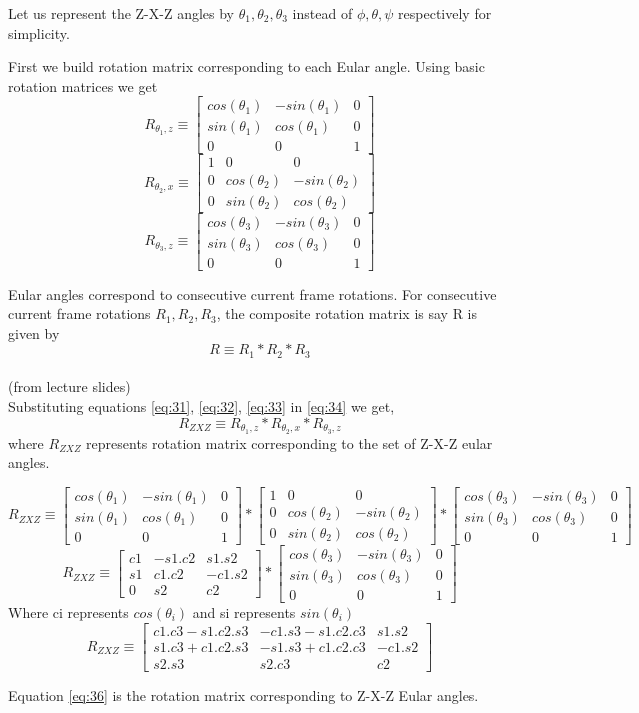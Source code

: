 \documentclass[12pt]{article}
\newcommand{\fromslides}{{\\ \color{blue} \hspace*{\fill}(from lecture slides)} \\}
\newcommand{\rx}[1]{\begin{bmatrix} 1 & 0 & 0 \\ 0 & cos(#1) & -sin(#1) \\ 0 & sin(#1) & cos(#1) \end{bmatrix}}
\newcommand{\rz}[1]{\begin{bmatrix} cos(#1) & -sin(#1) & 0 \\ sin(#1) & cos(#1) & 0 \\ 0 & 0 & 1 \end{bmatrix}}
\begin{document}
Let us represent the Z-X-Z angles by $ \theta_1, \theta_2, \theta_3 $ instead of $ \phi, \theta, \psi $ respectively for simplicity.

First we build rotation matrix corresponding to each Eular angle.
Using basic rotation matrices we get
\begin{equation}
  \label{eq:31}
  R_{\theta_1,z} \equiv \rz{\theta_1}
\end{equation}
\begin{equation}
  \label{eq:32}
  R_{\theta_2,x} \equiv \rx{\theta_2}
\end{equation}
\begin{equation}
  \label{eq:33}
  R_{\theta_3,z} \equiv \rz{\theta_3}
\end{equation}

Eular angles correspond to consecutive current frame rotations.
For consecutive current frame rotations $ R_1, R_2, R_3 $, the composite rotation matrix is say R is given by
\begin{equation}
  \label{eq:34}
  R \equiv R_1 * R_2 * R_3
\end{equation}
\fromslides

Substituting equations \ref{eq:31}, \ref{eq:32}, \ref{eq:33} in \ref{eq:34} we get,
\begin{equation}
  \label{eq:35}
  R_{ZXZ} \equiv R_{\theta_1,z} * R_{\theta_2,x} * R_{\theta_3,z}
\end{equation}
where $ R_{ZXZ} $ represents rotation matrix corresponding to the set of Z-X-Z eular angles.

\[
  R_{ZXZ} \equiv \rz{\theta_1} * \rx{\theta_2} * \rz{\theta_3}
\]
\[
  R_{ZXZ} \equiv \begin{bmatrix} c1 & -s1.c2 & s1.s2 \\ s1 & c1.c2 & -c1.s2 \\ 0 & s2 & c2 \end{bmatrix} * \rz{\theta_3}
\]
Where ci represents $ cos(\theta_i) $ and si represents $ sin(\theta_i) $
\begin{equation}
  \label{eq:36}
  R_{ZXZ} \equiv \begin{bmatrix} c1.c3 - s1.c2.s3 & -c1.s3 - s1.c2.c3 & s1.s2 \\ s1.c3 + c1.c2.s3 & -s1.s3 + c1.c2.c3 & -c1.s2 \\ s2.s3 & s2.c3 & c2 \end{bmatrix}
\end{equation}

Equation \ref{eq:36} is the rotation matrix corresponding to Z-X-Z Eular angles.
\end{document}

